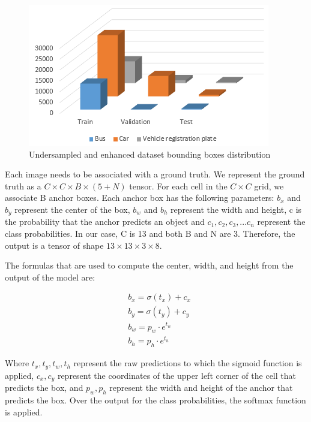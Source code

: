     
    
            
   \begin{figure}[!t]
      \centering
      \includegraphics[scale=0.5]{images/enhanced_dataset.png}
      \caption{Undersampled and enhanced dataset bounding boxes distribution}
      \label{enhanced_distribution}
    \end{figure} 
    
    Each image needs to be associated with a ground truth. We represent the ground truth as a $C \times C \times B \times (5+N)$ tensor. For each cell in the $C \times C$ grid, we associate B anchor boxes. Each anchor box has the following parameters: $b_x$ and $b_y$ represent the center of the box, $b_w$ and $b_h$ represent the width and height, c is the probability that the anchor predicts an object and $c_1, c_2, c_3, ... c_n$ represent the class probabilities. In our case, C is 13 and both B and N are 3. Therefore, the output is a tensor of shape $13 \times 13 \times 3 \times 8$.
    
    The formulas that are used to compute the center, width, and height from the output of the model are:
    
    \begin{equation}
    \begin{split}
        & b_x = \sigma(t_x) + c_x \\
        & b_y = \sigma(t_y) + c_y \\
        & b_w = p_w \cdot e^{t_w} \\ 
        & b_h = p_h \cdot e^{t_h}
    \end{split}
    \label{conversion_formulas}
    \end{equation}
    
    Where $t_x, t_y, t_w, t_h$ represent the raw predictions to which the sigmoid function is applied, $c_x, c_y$ represent the coordinates of the upper left corner of the cell that predicts the box, and $p_w, p_h$ represent the width and height of the anchor that predicts the box. Over the output for the class probabilities, the softmax function is applied.
    
    
    